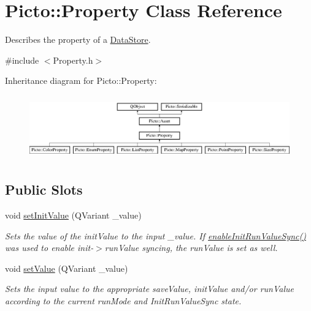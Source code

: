 \hypertarget{class_picto_1_1_property}{\section{Picto\-:\-:Property Class Reference}
\label{class_picto_1_1_property}
}


Describes the property of a \hyperlink{class_picto_1_1_data_store}{Data\-Store}.  




{\ttfamily \#include $<$Property.\-h$>$}

Inheritance diagram for Picto\-:\-:Property\-:\begin{figure}[H]
\begin{center}
\leavevmode
\includegraphics[height=2.786070cm]{class_picto_1_1_property}
\end{center}
\end{figure}
\subsection*{Public Slots}
\begin{DoxyCompactItemize}
\item 
\hypertarget{class_picto_1_1_property_afafa5da20aab9d456225166001427bc4}{void \hyperlink{class_picto_1_1_property_afafa5da20aab9d456225166001427bc4}{set\-Init\-Value} (Q\-Variant \-\_\-value)}\label{class_picto_1_1_property_afafa5da20aab9d456225166001427bc4}

\begin{DoxyCompactList}\small\item\em Sets the value of the init\-Value to the input \-\_\-value. If \hyperlink{class_picto_1_1_property_a3f7c0e0d81e687fccec996072d83418f}{enable\-Init\-Run\-Value\-Sync()} was used to enable init-\/$>$run\-Value syncing, the run\-Value is set as well. \end{DoxyCompactList}\item 
void \hyperlink{class_picto_1_1_property_a5554f476de8000d1da1b399d9f32d5ca}{set\-Value} (Q\-Variant \-\_\-value)
\begin{DoxyCompactList}\small\item\em Sets the input value to the appropriate save\-Value, init\-Value and/or run\-Value according to the current run\-Mode and Init\-Run\-Value\-Sync state. \end{DoxyCompactList}\end{DoxyCompactItemize}
